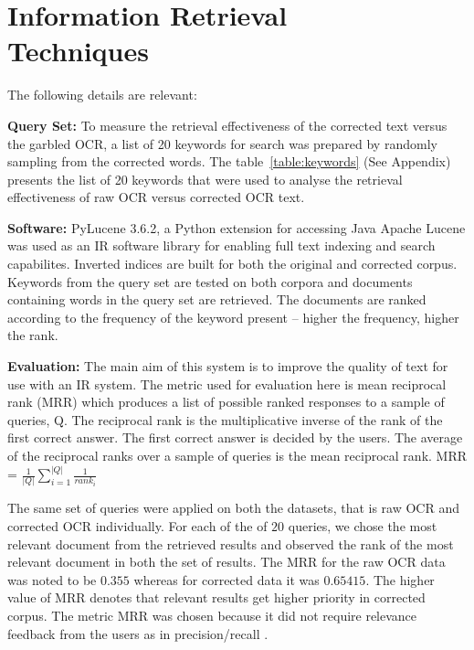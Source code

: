 \documentclass{sig-alternate}
\begin{document}
\section{Information Retrieval \\Techniques}
\label{ir}
The following details are relevant: 

\noindent \textbf{Query Set:} To measure the retrieval effectiveness of the corrected text versus the garbled OCR, a list of 20 keywords for search was prepared by randomly sampling from the corrected words. The table~\ref{table:keywords} (See Appendix) presents the list of 20 keywords that were used to analyse the retrieval effectiveness of raw OCR versus corrected OCR text.

\noindent \textbf{Software:} PyLucene 3.6.2, a Python extension for accessing Java Apache Lucene was used as an IR software library for enabling full text indexing and search capabilites. Inverted indices are built for both the original and corrected corpus. Keywords from the query set are tested on both corpora and documents containing words in the query set are retrieved. The documents are ranked according to the frequency of the keyword present -- higher the frequency, higher the rank.

\noindent \textbf{Evaluation:} The main aim of this system is to improve the quality of text for use with an IR system. The metric used for evaluation here is mean reciprocal rank (MRR) \cite{manning2008introduction} which produces a list of possible ranked responses to a sample of queries, Q. The reciprocal rank is the multiplicative inverse of the rank of the first correct answer. The first correct answer is decided by the users. The average of the reciprocal ranks over a sample of queries is the mean reciprocal rank.
MRR = $\frac{1}{|Q|} \sum_{i = 1}^{|Q|} \frac{1}{rank_{i}}$

The same set of queries were applied on both the datasets, that is raw OCR and corrected OCR individually. For each of the of $20$ queries, we chose the most relevant document from the retrieved results and observed the rank of the most relevant document in both the set of results. The MRR for the raw OCR data was noted to be $0.355$ whereas for corrected data it was $0.65415$. The higher value of MRR denotes that relevant results get higher priority in corrected corpus. The metric MRR was chosen because it did not require relevance feedback from the users as in precision/recall \cite{manning2008introduction}.

 
\end{document}
